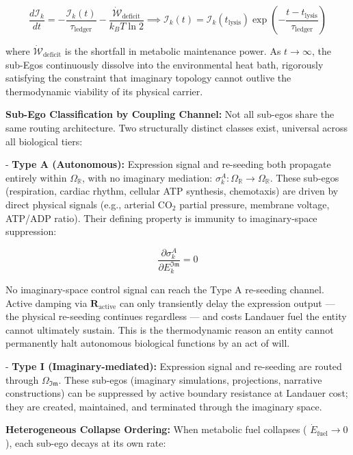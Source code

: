 \documentclass[11pt,a4paper]{article}
\theoremstyle{definition}
\theoremstyle{remark}
\begin{document}
\begin{equation}
\boxed{ \frac{d\mathcal{I}_k}{dt} = - \frac{\mathcal{I}_k(t)}{\tau_{\text{ledger}}} - \frac{\dot{\mathcal{W}}_{\text{deficit}}}{k_B T \ln 2} \implies \mathcal{I}_k(t) = \mathcal{I}_k(t_{\text{lysis}}) \exp\left( - \frac{t - t_{\text{lysis}}}{\tau_{\text{ledger}}} \right) }
\end{equation}


where $\dot{\mathcal{W}}_{\text{deficit}}$ is the shortfall in metabolic maintenance power. As $t \to \infty$, the sub-Egos continuously dissolve into the environmental heat bath, rigorously satisfying the constraint that imaginary topology cannot outlive the thermodynamic viability of its physical carrier.

\textbf{Sub-Ego Classification by Coupling Channel:} Not all sub-egos share the same routing architecture. Two structurally distinct classes exist, universal across all biological tiers:

- \textbf{Type A (Autonomous):} Expression signal and re-seeding both propagate entirely within $\Omega_{\mathbb{R}}$, with no imaginary mediation: $\sigma_k^A: \Omega_{\mathbb{R}} \to \Omega_{\mathbb{R}}$. These sub-egos (respiration, cardiac rhythm, cellular ATP synthesis, chemotaxis) are driven by direct physical signals (e.g., arterial CO$_2$ partial pressure, membrane voltage, ATP/ADP ratio). Their defining property is immunity to imaginary-space suppression:


\begin{equation}
\boxed{\frac{\partial \sigma_k^A}{\partial E_k^{\mathfrak{Im}}} = 0}
\end{equation}


No imaginary-space control signal can reach the Type A re-seeding channel. Active damping via $\mathbf{R}_{\text{active}}$ can only transiently delay the expression output — the physical re-seeding continues regardless — and costs Landauer fuel the entity cannot ultimately sustain. This is the thermodynamic reason an entity cannot permanently halt autonomous biological functions by an act of will.

- \textbf{Type I (Imaginary-mediated):} Expression signal and re-seeding are routed through $\Omega_{\mathfrak{Im}}$. These sub-egos (imaginary simulations, projections, narrative constructions) can be suppressed by active boundary resistance at Landauer cost; they are created, maintained, and terminated through the imaginary space.

\textbf{Heterogeneous Collapse Ordering:} When metabolic fuel collapses ( $\dot{E}_{\text{fuel}} \to 0$ ), each sub-ego decays at its own rate:
\end{document}
